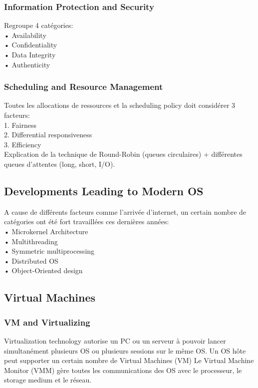 \subsubsection{Information Protection and Security}
Regroupe 4 catégories: \\
• Availability \\
• Confidentiality \\
• Data Integrity \\
• Authenticity \\

\subsubsection{Scheduling and Resource Management}
Toutes les allocations de ressources et la scheduling policy doit considérer 3 facteurs: \\
1. Fairness \\
2. Differential responsiveness \\
3. Efficiency \\
Explication de la technique de Round-Robin (queues circulaires) + différentes queues d’attentes (long, short, I/O).

\subsection{Developments Leading to Modern OS}
A cause de différents facteurs comme l’arrivée d’internet, un certain nombre de catégories ont été fort travaillées ces dernières années: \\
• Microkernel Architecture \\
• Multithreading \\
• Symmetric multiprocessing \\
• Distributed OS \\
• Object-Oriented design \\

\subsection{Virtual Machines}

\subsubsection{VM and Virtualizing}
Virtualization technology autorise un PC ou un serveur à pouvoir lancer simultanément plusieurs OS ou plusieurs sessions sur le même OS. Un OS hôte peut supporter un certain nombre de Virtual Machines (VM)
Le Virtual Machine Monitor (VMM) gère toutes les communications des OS avec le processeur, le storage medium et le réseau.

